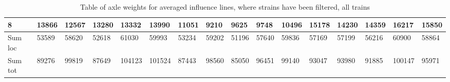 \begin{sidewaystable}
{\begin{tabularx}{\textheight}{ |l|X|X|X|X|X|X|X|X|X|X|X|X|X|X|X| }
		\hline
		8 & 13866   &    12567   &    13280   &    13332   &    13990   &    11051   &     9210   &     9625   &     9748   &    10496    &   15178    &   14230    &   14359   &    16217 &	15850 \\
		\hline
		Sum loc & 53589   &    58620   &    52618   &    61030   &    59993   &    53234   &    59202   &    51196   &    57640   &    59836    &   57169    &   57199    &   56216   &    60900 &	58864 \\
		\hline
		Sum tot & 89276   &    99819   &    87649   &   104123   &   101524   &    87443   &    98560   &    85050   &    96451   &    99140    &   93047    &   93980    &   91885   &   100147 &	95971 \\
		\bottomrule
	\end{tabularx}}
	\caption{Table of axle weights for averaged influence lines, where strains have been filtered, all trains}
	\label{table:axleWeights_filteredStrains_trains_all_sensors}
\end{sidewaystable}

